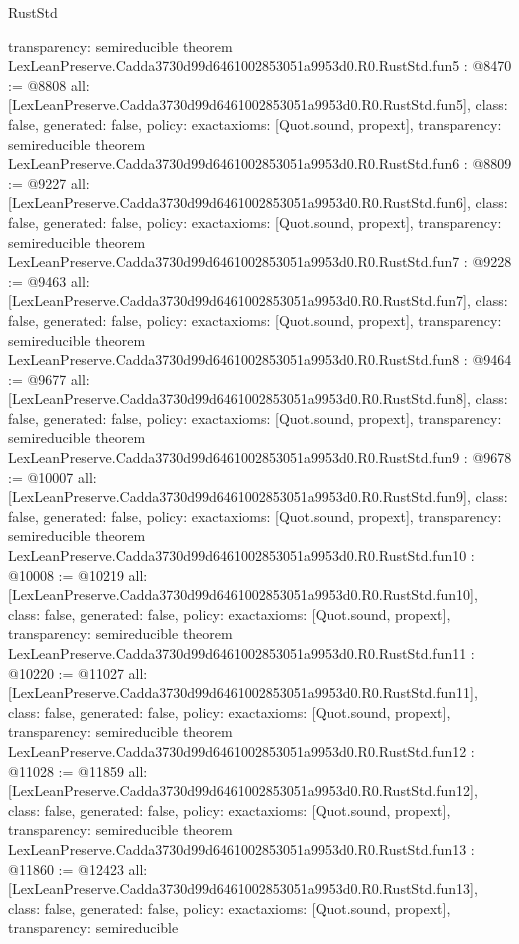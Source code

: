 \begin{lexlean}{RustStd}
\begin{coremodule}
{  transparency: semireducible
}
theorem LexLeanPreserve.Cadda3730d99d6461002853051a9953d0.R0.RustStd.fun5 : @8470 := @8808 {
  all: [LexLeanPreserve.Cadda3730d99d6461002853051a9953d0.R0.RustStd.fun5],
  class: false,
  generated: false,
  policy: exact{axioms: [Quot.sound, propext]},
  transparency: semireducible
}
theorem LexLeanPreserve.Cadda3730d99d6461002853051a9953d0.R0.RustStd.fun6 : @8809 := @9227 {
  all: [LexLeanPreserve.Cadda3730d99d6461002853051a9953d0.R0.RustStd.fun6],
  class: false,
  generated: false,
  policy: exact{axioms: [Quot.sound, propext]},
  transparency: semireducible
}
theorem LexLeanPreserve.Cadda3730d99d6461002853051a9953d0.R0.RustStd.fun7 : @9228 := @9463 {
  all: [LexLeanPreserve.Cadda3730d99d6461002853051a9953d0.R0.RustStd.fun7],
  class: false,
  generated: false,
  policy: exact{axioms: [Quot.sound, propext]},
  transparency: semireducible
}
theorem LexLeanPreserve.Cadda3730d99d6461002853051a9953d0.R0.RustStd.fun8 : @9464 := @9677 {
  all: [LexLeanPreserve.Cadda3730d99d6461002853051a9953d0.R0.RustStd.fun8],
  class: false,
  generated: false,
  policy: exact{axioms: [Quot.sound, propext]},
  transparency: semireducible
}
theorem LexLeanPreserve.Cadda3730d99d6461002853051a9953d0.R0.RustStd.fun9 : @9678 := @10007 {
  all: [LexLeanPreserve.Cadda3730d99d6461002853051a9953d0.R0.RustStd.fun9],
  class: false,
  generated: false,
  policy: exact{axioms: [Quot.sound, propext]},
  transparency: semireducible
}
theorem LexLeanPreserve.Cadda3730d99d6461002853051a9953d0.R0.RustStd.fun10 : @10008 := @10219 {
  all: [LexLeanPreserve.Cadda3730d99d6461002853051a9953d0.R0.RustStd.fun10],
  class: false,
  generated: false,
  policy: exact{axioms: [Quot.sound, propext]},
  transparency: semireducible
}
theorem LexLeanPreserve.Cadda3730d99d6461002853051a9953d0.R0.RustStd.fun11 : @10220 := @11027 {
  all: [LexLeanPreserve.Cadda3730d99d6461002853051a9953d0.R0.RustStd.fun11],
  class: false,
  generated: false,
  policy: exact{axioms: [Quot.sound, propext]},
  transparency: semireducible
}
theorem LexLeanPreserve.Cadda3730d99d6461002853051a9953d0.R0.RustStd.fun12 : @11028 := @11859 {
  all: [LexLeanPreserve.Cadda3730d99d6461002853051a9953d0.R0.RustStd.fun12],
  class: false,
  generated: false,
  policy: exact{axioms: [Quot.sound, propext]},
  transparency: semireducible
}
theorem LexLeanPreserve.Cadda3730d99d6461002853051a9953d0.R0.RustStd.fun13 : @11860 := @12423 {
  all: [LexLeanPreserve.Cadda3730d99d6461002853051a9953d0.R0.RustStd.fun13],
  class: false,
  generated: false,
  policy: exact{axioms: [Quot.sound, propext]},
  transparency: semireducible
}
\end{coremodule}
\end{lexlean}
